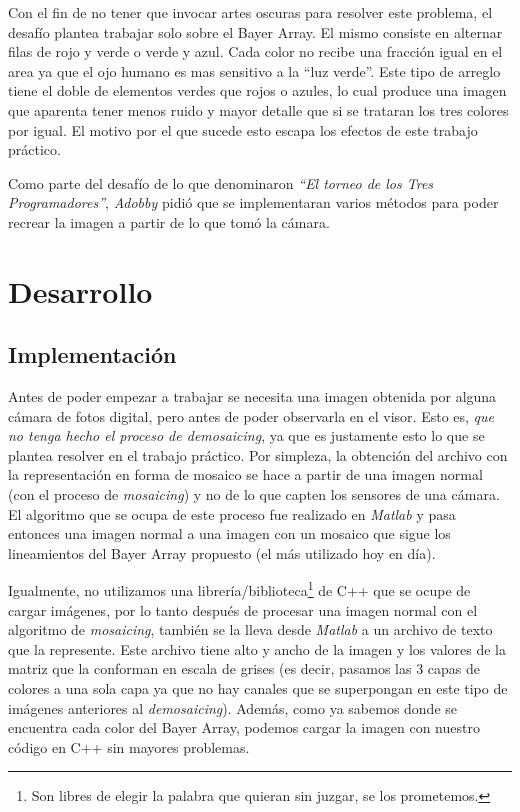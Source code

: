\vspace{\baselineskip}

Con el fin de no tener que invocar artes oscuras para resolver este problema, el desafío plantea trabajar solo sobre el Bayer Array. El mismo consiste en alternar filas de rojo y verde o verde y azul. Cada color no recibe una fracción igual en el area ya que el ojo humano es mas sensitivo a la ``luz verde''. Este tipo de arreglo tiene el doble de elementos verdes que rojos o azules, lo cual produce una imagen que aparenta tener menos ruido y mayor detalle que si se trataran los tres colores por igual. El motivo por el que sucede esto escapa los efectos de este trabajo práctico.

\vspace{\baselineskip}

Como parte del desafío de lo que denominaron \textit{``El torneo de los Tres Programadores''}, \textit{Adobby} pidió que se implementaran varios métodos para poder recrear la imagen a partir de lo que tomó la cámara.

\newpage

\section{Desarrollo}

\subsection{Implementación}

Antes de poder empezar a trabajar se necesita una imagen obtenida por alguna cámara de fotos digital, pero antes de poder observarla en el visor. Esto es, \textit{que no tenga hecho el proceso de demosaicing}, ya que es justamente esto lo que se plantea resolver en el trabajo práctico. Por simpleza, la obtención del archivo con la representación en forma de mosaico se hace a partir de una imagen normal (con el proceso de \textit{mosaicing}) y no de lo que capten los sensores de una cámara. El algoritmo que se ocupa de este proceso fue realizado en \textit{Matlab} y pasa entonces una imagen normal a una imagen con un mosaico que sigue los lineamientos del Bayer Array propuesto (el más utilizado hoy en día).

\vspace{\baselineskip}

Igualmente, no utilizamos una librería/biblioteca\footnote{Son libres de elegir la palabra que quieran sin juzgar, se los prometemos.} de C++ que se ocupe de cargar imágenes, por lo tanto después de procesar una imagen normal con el algoritmo de \textit{mosaicing}, también se la lleva desde \textit{Matlab} a un archivo de texto que la represente. Este archivo tiene alto y ancho de la imagen y los valores de la matriz que la conforman en escala de grises (es decir, pasamos las 3 capas de colores a una sola capa ya que no hay canales que se superpongan en este tipo de imágenes anteriores al \textit{demosaicing}). Además, como ya sabemos donde se encuentra cada color del Bayer Array, podemos cargar la imagen con nuestro código en C++ sin mayores problemas.

